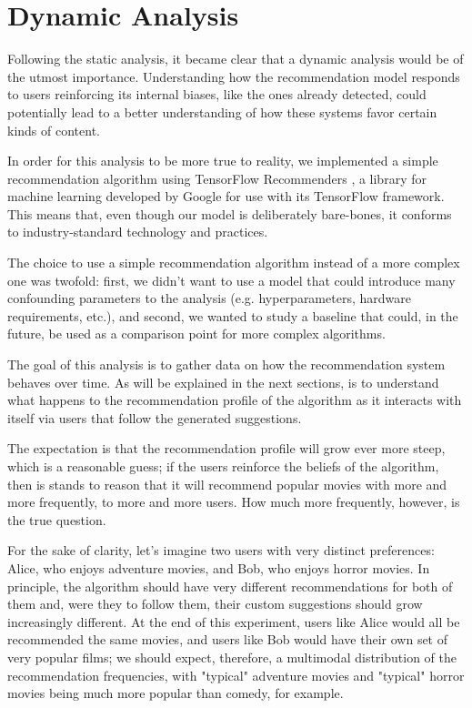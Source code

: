 
\chapter{Dynamic Analysis}
\label{cap:dynamic}

Following the static analysis, it became clear that a dynamic analysis would be
of the utmost importance. Understanding how the recommendation model responds to
users reinforcing its internal biases, like the ones already detected, could
potentially lead to a better understanding of how these systems favor certain
kinds of content.

In order for this analysis to be more true to reality, we implemented a simple
recommendation algorithm using TensorFlow Recommenders \citep{}, a library for
machine learning developed by Google for use with its TensorFlow \citep{}
framework. This means that, even though our model is deliberately bare-bones, it
conforms to industry-standard technology and practices.

The choice to use a simple recommendation algorithm instead of a more complex
one was twofold: first, we didn't want to use a model that could introduce many
confounding parameters to the analysis (e.g. hyperparameters, hardware
requirements, etc.), and second, we wanted to study a baseline that could, in
the future, be used as a comparison point for more complex algorithms.

The goal of this analysis is to gather data on how the recommendation system
behaves over time. As will be explained in the next sections, is to understand
what happens to the recommendation profile of the algorithm as it interacts with
itself via users that follow the generated suggestions.

The expectation is that the recommendation profile will grow ever more steep,
which is a reasonable guess; if the users reinforce the beliefs of the
algorithm, then is stands to reason that it will recommend popular movies with
more and more frequently, to more and more users. How much more frequently,
however, is the true question.

For the sake of clarity, let's imagine two users with very distinct preferences:
Alice, who enjoys adventure movies, and Bob, who enjoys horror movies. In
principle, the algorithm should have very different recommendations for both of
them and, were they to follow them, their custom suggestions should grow
increasingly different. At the end of this experiment, users like Alice would
all be recommended the same movies, and users like Bob would have their own set
of very popular films; we should expect, therefore, a multimodal distribution of
the recommendation frequencies, with "typical" adventure movies and "typical"
horror movies being much more popular than comedy, for example.

